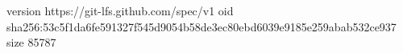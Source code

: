 version https://git-lfs.github.com/spec/v1
oid sha256:53c5f1da6fe591327f545d9054b58de3ec80ebd6039e9185e259abab532ce937
size 85787
